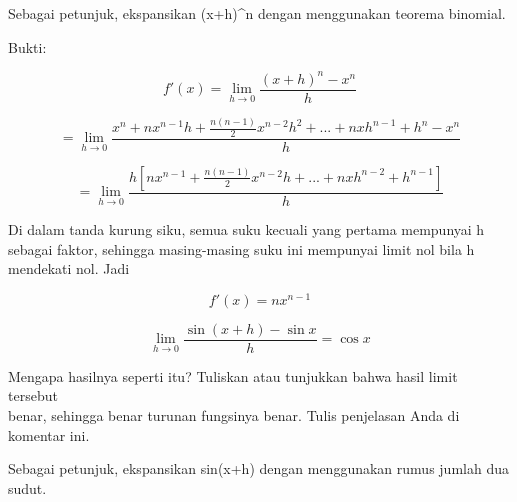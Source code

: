 \documentclass{article}
\begin{document}
\begin{eulernotebook}
\begin{eulercomment}
\begin{eulercomment}
\begin{eulercomment}
Sebagai petunjuk, ekspansikan (x+h)\textasciicircum{}n dengan menggunakan teorema
binomial.

Bukti:\\
\end{eulercomment}
\begin{eulerformula}
\[
f'(x)=\lim_{h\to 0} \frac{(x+h)^n-x^n}{h}
\]
\end{eulerformula}
\begin{eulerformula}
\[
=\lim_{h\to 0} \frac{x^n+nx^{n-1}h+\frac{n(n-1)}{2}x^{n-2}h^2+...+nxh^{n-1}+h^n-x^n}{h}
\]
\end{eulerformula}
\begin{eulerformula}
\[
=\lim_{h\to 0} \frac{h\left [nx^{n-1}+\frac{n(n-1)}{2}x^{n-2}h+...+nxh^{n-2}+h^{n-1}\right ]}{h}
\]
\end{eulerformula}
\begin{eulercomment}
Di dalam tanda kurung siku, semua suku kecuali yang pertama mempunyai
h sebagai faktor, sehingga masing-masing suku ini mempunyai limit nol
bila h mendekati nol. Jadi\\
\end{eulercomment}
\begin{eulerformula}
\[
f'(x)=nx^{n-1}
\]
\end{eulerformula}
\begin{eulerformula}
\[
\lim_{h\rightarrow 0}{\frac{\sin \left(x+h\right)-\sin x}{h}}=\cos   x
\]
\end{eulerformula}
\begin{eulercomment}
Mengapa hasilnya seperti itu? Tuliskan atau tunjukkan bahwa hasil
limit tersebut\\
benar, sehingga benar turunan fungsinya benar.  Tulis penjelasan Anda
di komentar ini.

Sebagai petunjuk, ekspansikan sin(x+h) dengan menggunakan rumus jumlah
dua sudut.


\end{eulercomment}
\end{eulercomment}
\end{eulercomment}
\end{eulernotebook}
\end{document}
